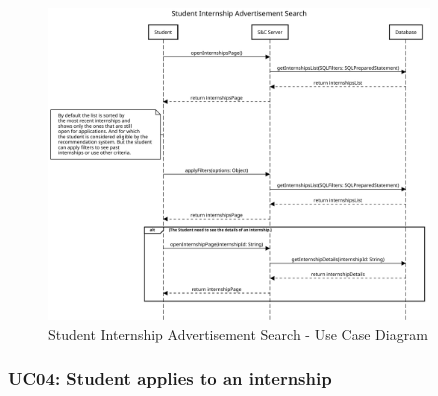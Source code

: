 \begin{figure}[H]
    \centering
    \includegraphics[width=0.9\textwidth]{Images/UC_3.pdf}
    \caption{Student Internship Advertisement Search - Use Case Diagram}
    \label{fig:use-case-diagram-3}
\end{figure}


\subsubsection{UC04: Student applies to an internship}
\label{subsubsec:student-applies-to-an-internship}

